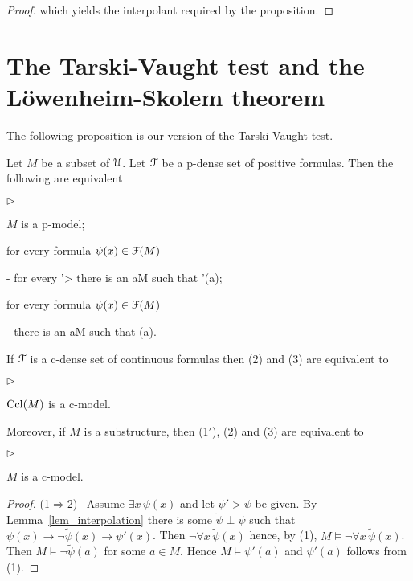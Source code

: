 \documentclass{amsproc}
\newcommand{\mylabel}[1]{{#1}\hfill}
\renewenvironment{itemize}
  {\begin{list}{$\triangleright$}{%
  \setlength{\parskip}{0mm}
  \setlength{\topsep}{.4\baselineskip}
  \setlength{\rightmargin}{0mm}
  \setlength{\listparindent}{0mm}
  \setlength{\itemindent}{0mm}
  \setlength{\labelwidth}{3ex}
  \setlength{\itemsep}{.2\baselineskip}
  \setlength{\parsep}{.2\baselineskip}
  \setlength{\partopsep}{0mm}
  \setlength{\labelsep}{1ex}
  \setlength{\leftmargin}{\labelwidth+\labelsep}
  \let\makelabel\mylabel}}{%
\end{list}}
\begin{document}
{\begin{proof}
  which yields the interpolant required by the proposition.
\end{proof}

\section{The Tarski-Vaught test and the L\"owenheim-Skolem theorem}

The following proposition is our version of the Tarski-Vaught test.

\begin{theorem}\label{thm_Tarski_Vaught}
  Let $M$ be a subset of ${\EuScript U}$.
  Let ${\EuScript F}$ be a p-dense set of positive formulas.
  Then the following are equivalent
  \begin{itemize}
    \item[1.] $M$ is a p-model;
    \item[2.] for every formula $\psi(x)\in{\EuScript F}(M)$
    
    \noindent\kern-\leftmargin
    {\textrm{ for every }\psi'>\psi\textrm{ there is an }a\in M\textrm{ such that }\psi'(a);}
  
    \item[3.] for every formula $\psi(x)\in{\EuScript F}(M)$
    
    \noindent\kern-\leftmargin
    {\textrm{ there is an }a\in M\textrm{ such that }\neg\psi(a).}
  \end{itemize}
  If ${\EuScript F}$ is a c-dense set of continuous formulas then (2) and (3) are equivalent to
  \begin{itemize}
    \item[1$'$.] ${\rm Ccl}(M)$ is a c-model.
  \end{itemize}
  Moreover, if $M$ is a substructure, then (1$'$), (2) and (3) are equivalent to
  \begin{itemize}
    \item[1$''$.] $M$ is a c-model.
  \end{itemize}
\end{theorem}

\begin{proof}
  (1$\Rightarrow$2) \ 
  Assume $\exists x\,\psi(x)$ and let $\psi'>\psi$ be given.
  By Lemma~\ref{lem_interpolation} there is some $\tilde{\psi}\perp\psi$ such that  $\psi(x)\rightarrow\neg\tilde{\psi}(x)\rightarrow\psi'(x)$.
  Then $\neg\forall x\,\tilde{\psi}(x)$ hence, by (1), $M\models\neg\forall x\,\tilde{\psi}(x)$.
  Then $M\models\neg\tilde{\psi}(a)$ for some $a\in M$. Hence $M\models\psi'(a)$ and $\psi'(a)$ follows from (1).


\end{proof}}
\end{document}
